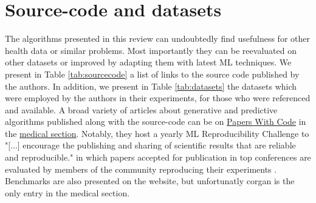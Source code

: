 \section{Source-code and datasets}
The algorithms presented in this review can undoubtedly find usefulness for other health data or similar problems. Most importantly they can be reevaluated on other datasets or improved by adapting them with latest ML techniques. We present in Table \ref{tab:sourcecode} a list of links to the source code published by the authors. In addition, we present in Table \ref{tab:datasets} the datasets which were employed by the authors in their experiments, for those who were referenced and available. A broad variety of articles about generative and predictive algorithms published along with the source-code can be on \href{https://paperswithcode.com}{Papers With Code} in the \href{https://paperswithcode.com/area/medical}{medical section}. Notably, they host a yearly ML Reproducibility Challenge to "[...] encourage the publishing and sharing of scientific results that are reliable and reproducible." in which papers accepted for publication in top conferences are evaluated by members of the community reproducing their experiments \cite{Sinha}. Benchmarks are also presented on the website, but unfortunatly \gls{corgan} is the only entry in the medical section. 



